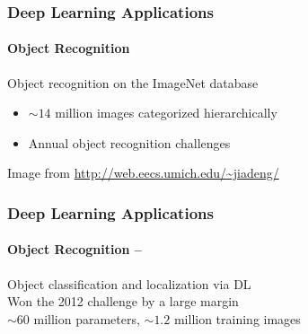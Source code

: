 \documentclass[xetex,professionalfont]{beamer}
\begin{document}

\begin{frame}
\frametitle{Deep Learning Applications}
\framesubtitle{Object Recognition}

Object recognition on the ImageNet database
\begin{itemize}
    \item $\sim14$ million images categorized hierarchically
    \item Annual object recognition challenges
\end{itemize}

\begin{center}
    {\centering Image from \url{http://web.eecs.umich.edu/~jiadeng/}}
\end{center}

\end{frame}


\begin{frame}
\frametitle{Deep Learning Applications}
\framesubtitle{Object Recognition -- \cite{krizhevsky2012}}

Object classification and localization via DL\\\medskip %
Won the 2012 challenge by a large margin\\\medskip %
$\sim60$ million parameters, $\sim1.2$ million training images %

\bigskip
\begin{center}
\end{center}

\end{frame}
\end{document}
